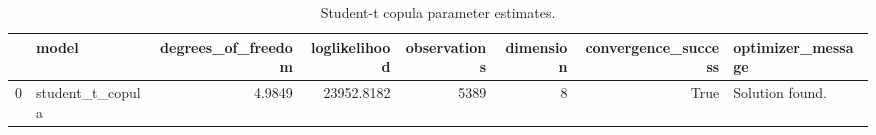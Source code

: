 \begin{table}
\caption{Student-t copula parameter estimates.}
\label{tab:student_t_copula_params}
\begin{tabular}{llrrrrrl}
\toprule
 & model & degrees_of_freedom & loglikelihood & observations & dimension & convergence_success & optimizer_message \\
\midrule
0 & student_t_copula & 4.9849 & 23952.8182 & 5389 & 8 & True & Solution found. \\
\bottomrule
\end{tabular}
\end{table}
